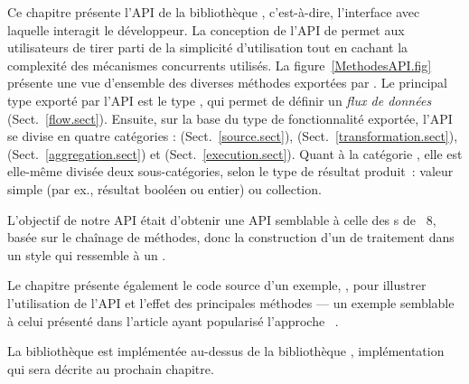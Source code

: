 Ce chapitre pr\'esente l'API de la biblioth\`eque \ppff,  c'est-\`a-dire, l'interface avec laquelle interagit le d\'eveloppeur. La conception de l'API de \ppff{} permet aux utilisateurs de tirer parti de la simplicit\'e d'utilisation tout en cachant la complexit\'e des m\'ecanismes concurrents utilis\'es. La figure~\ref{MethodesAPI.fig} pr\'esente une vue d'ensemble des diverses m\'ethodes export\'ees par \ppff.
%
Le principal type exporté par l'API est le type , qui permet de définir un \emph{flux de données} (Sect.~\ref{flow.sect}).
%
Ensuite, sur la base du type de fonctionnalit\'e export\'ee, l'API se divise en quatre cat\'egories :   (Sect.~\ref{source.sect}),  (Sect.~\ref{transformation.sect}),   (Sect.~\ref{aggregation.sect}) et  (Sect.~\ref{execution.sect}). Quant \`a la cat\'egorie , elle est elle-m\^eme divis\'ee deux sous-cat\'egories, selon le type de r\'esultat produit~: valeur simple (par ex., r\'esultat bool\'een ou entier) ou collection.

L'objectif de notre API \'etait d'obtenir une API semblable \`a celle des s de ~8, bas\'ee sur le cha\^inage de m\'ethodes, donc la construction d'un  de traitement dans un style qui ressemble \`a un .




Le chapitre pr\'esente \'egalement le code source d'un exemple, , pour illustrer l'utilisation de l'API et l'effet des principales m\'ethodes --- un exemple semblable à celui présenté dans l'article ayant popularisé l'approche ~\citep{DeanGhe04}.

La biblioth\`eque \PpFf{} est impl\'ement\'ee au-dessus de la biblioth\`eque , impl\'ementation qui sera d\'ecrite au prochain chapitre.




